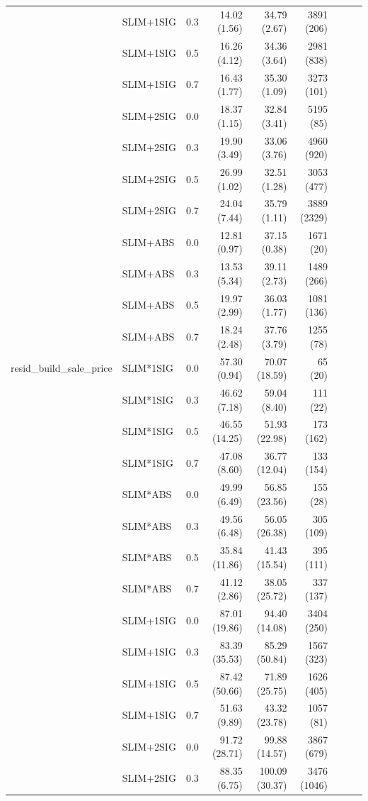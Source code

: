\begin{longtable}{lllrrrrrr}
 & SLIM+1SIG & 0.3 & 14.02 (1.56) & 34.79 (2.67) & 3891 (206) \\
 & SLIM+1SIG & 0.5 & 16.26 (4.12) & 34.36 (3.64) & 2981 (838) \\
 & SLIM+1SIG & 0.7 & 16.43 (1.77) & 35.30 (1.09) & 3273 (101) \\
 & SLIM+2SIG & 0.0 & 18.37 (1.15) & 32.84 (3.41) & 5195 (85) \\
 & SLIM+2SIG & 0.3 & 19.90 (3.49) & 33.06 (3.76) & 4960 (920) \\
 & SLIM+2SIG & 0.5 & 26.99 (1.02) & 32.51 (1.28) & 3053 (477) \\
 & SLIM+2SIG & 0.7 & 24.04 (7.44) & 35.79 (1.11) & 3889 (2329) \\
 & SLIM+ABS & 0.0 & 12.81 (0.97) & 37.15 (0.38) & 1671 (20) \\
 & SLIM+ABS & 0.3 & 13.53 (5.34) & 39.11 (2.73) & 1489 (266) \\
 & SLIM+ABS & 0.5 & 19.97 (2.99) & 36.03 (1.77) & 1081 (136) \\
 & SLIM+ABS & 0.7 & 18.24 (2.48) & 37.76 (3.79) & 1255 (78) \\
\midrule
resid_build_sale_price & SLIM*1SIG & 0.0 & 57.30 (0.94) & 70.07 (18.59) & 65 (20) \\
 & SLIM*1SIG & 0.3 & 46.62 (7.18) & 59.04 (8.40) & 111 (22) \\
 & SLIM*1SIG & 0.5 & 46.55 (14.25) & 51.93 (22.98) & 173 (162) \\
 & SLIM*1SIG & 0.7 & 47.08 (8.60) & 36.77 (12.04) & 133 (154) \\
 & SLIM*ABS & 0.0 & 49.99 (6.49) & 56.85 (23.56) & 155 (28) \\
 & SLIM*ABS & 0.3 & 49.56 (6.48) & 56.05 (26.38) & 305 (109) \\
 & SLIM*ABS & 0.5 & 35.84 (11.86) & 41.43 (15.54) & 395 (111) \\
 & SLIM*ABS & 0.7 & 41.12 (2.86) & 38.05 (25.72) & 337 (137) \\
 & SLIM+1SIG & 0.0 & 87.01 (19.86) & 94.40 (14.08) & 3404 (250) \\
 & SLIM+1SIG & 0.3 & 83.39 (35.53) & 85.29 (50.84) & 1567 (323) \\
 & SLIM+1SIG & 0.5 & 87.42 (50.66) & 71.89 (25.75) & 1626 (405) \\
 & SLIM+1SIG & 0.7 & 51.63 (9.89) & 43.32 (23.78) & 1057 (81) \\
 & SLIM+2SIG & 0.0 & 91.72 (28.71) & 99.88 (14.57) & 3867 (679) \\
 & SLIM+2SIG & 0.3 & 88.35 (6.75) & 100.09 (30.37) & 3476 (1046) \\

\end{longtable}
